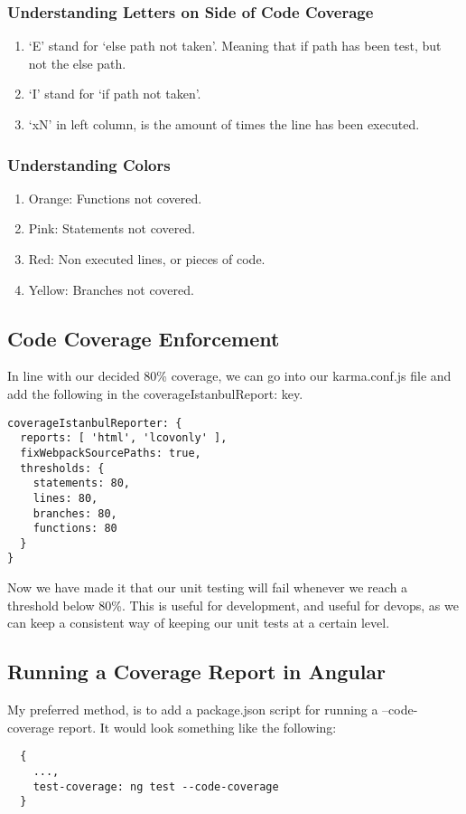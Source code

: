 \subsubsection{Understanding Letters on Side of Code Coverage}
\begin{enumerate}
  \item `E' stand for `else path not taken'. Meaning that if path has been test,
  but not the else path.
  \item `I' stand for `if path not taken'.
  \item `xN' in left column, is the amount of times the line has been executed.
\end{enumerate}

\subsubsection{Understanding Colors}
\begin{enumerate}
  \item Orange: Functions not covered.
  \item Pink: Statements not covered.
  \item Red: Non executed lines, or pieces of code.
  \item Yellow: Branches not covered.
\end{enumerate}

\subsection{ Code Coverage Enforcement }
In line with our decided 80\% coverage, we can go into our karma.conf.js file
and add the following in the coverageIstanbulReport: key.
\begin{lstlisting}
coverageIstanbulReporter: {
  reports: [ 'html', 'lcovonly' ],
  fixWebpackSourcePaths: true,
  thresholds: {
    statements: 80,
    lines: 80,
    branches: 80,
    functions: 80
  }
}
\end{lstlisting}
Now we have made it that our unit testing will fail whenever we reach a
threshold below 80\%. This is useful for development, and useful for devops, as
we can keep a consistent way of keeping our unit tests at a certain level.

\subsection{ Running a Coverage Report in Angular }
My preferred method, is to add a package.json script for running a
--code-coverage report. It would look something like the following:
\begin{verbatim}
  {
    ...,
    test-coverage: ng test --code-coverage
  }
\end{verbatim}


